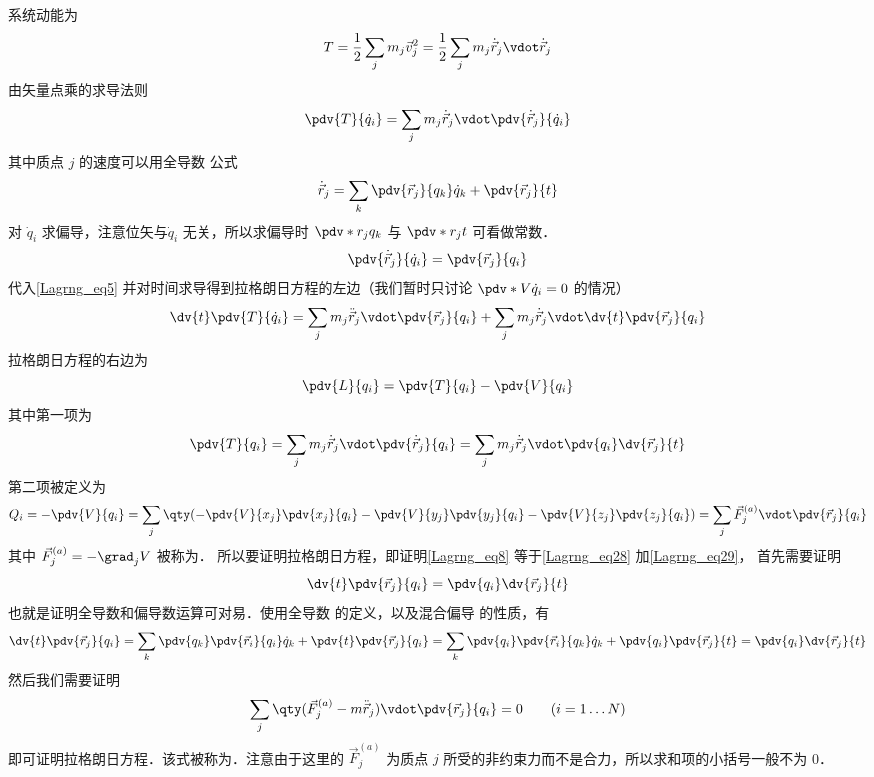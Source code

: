 系统动能为
\begin{equation}
T = \frac12 \sum_j m_j \vec v_j^2 = \frac12 \sum_j m_j \dot{\vec r}_j \vdot \dot{\vec r}_j
\end{equation}
由矢量点乘的求导法则
\begin{equation}\label{Lagrng_eq5}
\pdv{T}{\dot q_i} = \sum_j m_j \dot{\vec r}_j \vdot \pdv{\dot{\vec r}_j}{\dot q_i}
\end{equation}
其中质点 $j$ 的速度可以用全导数 公式
\begin{equation}
\dot{\vec r}_j = \sum_k \pdv{\vec r_j}{q_k} \dot q_k  + \pdv{\vec r_j}{t}
\end{equation}
对 $\dot q_i$ 求偏导，注意位矢与$\dot q_i$ 无关，所以求偏导时 $\pdv*{r_j}{q_k}$ 与 $\pdv*{r_j}{t}$ 可看做常数．
\begin{equation}\label{Lagrng_eq27}
\pdv{\dot{\vec r}_j}{\dot q_i} = \pdv{\vec r_j}{q_i}
\end{equation}
代入\autoref{Lagrng_eq5} 并对时间求导得到拉格朗日方程的左边（我们暂时只讨论 $\pdv*{V}{\dot q_i} = 0$ 的情况）
\begin{equation}\label{Lagrng_eq8}
\dv{t} \pdv{T}{\dot q_i} = \sum_j m_j \ddot{\vec r}_j \vdot \pdv{\vec r_j}{q_i}  + \sum_j m_j \dot{\vec r}_j \vdot \dv{t} \pdv{\vec r_j}{q_i}
\end{equation}
拉格朗日方程的右边为
\begin{equation}\label{Lagrng_eq9}
\pdv{L}{q_i} = \pdv{T}{q_i} - \pdv{V}{q_i}
\end{equation}
其中第一项为
\begin{equation}\label{Lagrng_eq28}
\pdv{T}{q_i} = \sum_j m_j \dot{\vec r}_j \vdot \pdv{\dot{\vec r}_j}{q_i} = \sum_j m_j \dot{\vec r}_j \vdot \pdv{q_i} \dv{\vec r_j}{t}
\end{equation}
第二项被定义为
\begin{equation}\label{Lagrng_eq29}
Q_i = - \pdv{V}{q_i} = \sum_j \qty(-\pdv{V}{x_j} \pdv{x_j}{q_i} - \pdv{V}{y_j}\pdv{y_j}{q_i} - \pdv{V}{z_j} \pdv{z_j}{q_i}) = \sum_j \vec F_j^{(a)} \vdot \pdv{\vec r_j}{q_i}
\end{equation}
其中 $\vec F_j^{(a)} = - \grad_j V$ 被称为．%
所以要证明拉格朗日方程，即证明\autoref{Lagrng_eq8} 等于\autoref{Lagrng_eq28} 加\autoref{Lagrng_eq29}， 首先需要证明
\begin{equation}
\dv{t} \pdv{\vec r_j}{q_i} = \pdv{q_i} \dv{\vec r_j}{t}
\end{equation}
也就是证明全导数和偏导数运算可对易．使用全导数 的定义，以及混合偏导 的性质，有
\begin{equation}
\dv{t} \pdv{\vec r_j}{q_i} = \sum_k \pdv{q_k} \pdv{\vec r_i}{q_i} \dot q_k  + \pdv{t} \pdv{\vec r_j}{q_i} = \sum_k \pdv{q_i} \pdv{\vec r_i}{q_k} \dot q_k + \pdv{q_i} \pdv{\vec r_j}{t} = \pdv{q_i} \dv{\vec r_j}{t}
\end{equation}
然后我们需要证明
\begin{equation}
\sum_j \qty(\vec F_j^{(a)} - m\ddot{\vec r}_j) \vdot \pdv{\vec r_j}{q_i}  = 0
\qquad (i = 1\dots N)
\end{equation}
即可证明拉格朗日方程．该式被称为．注意由于这里的 $\vec F_j^{(a)}$ 为质点 $j$ 所受的非约束力而不是合力，所以求和项的小括号一般不为 0．

